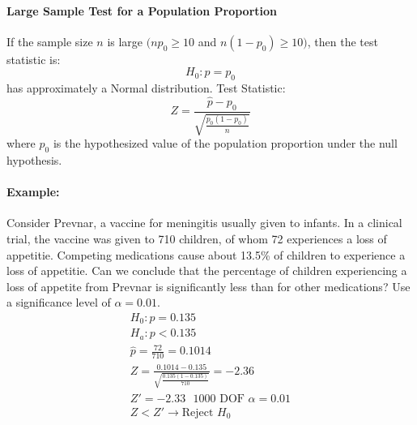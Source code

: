 \paragraph*{Large Sample Test for a Population Proportion}
If the sample size $n$ is large $(np_0 \geq 10$ and $n(1-p_0) \geq 10)$, then the test statistic is:
\[
    H_0 : p = p_0
\]
has approximately a Normal distribution. Test Statistic:
\[
    Z = \frac{\hat{p} - p_0}{\sqrt{\frac{p_0(1 - p_0)}{n}}}
\]
where $p_0$ is the hypothesized value of the population proportion under the null hypothesis.

\paragraph*{Example:}
Consider Prevnar, a vaccine for meningitis usually given to infants. In a clinical trial, the vaccine was given to 710 children,
of whom 72 experiences a loss of appetitie. Competing medications cause about 13.5\% of 
children to experience a loss of appetitie. Can we conclude that the percentage of children experiencing a loss of 
appetite from Prevnar is significantly less than for other medications? Use a significance level of $\alpha = 0.01$.
\begin{align*}
    H_0 : p = 0.135\\
    H_a : p < 0.135\\
    \hat{p} = \frac{72}{710} = 0.1014\\
    Z = \frac{0.1014 - 0.135}{\sqrt{\frac{0.135(1-0.135)}{710}}} = -2.36\\
    Z' = -2.33 \text{ ~1000 DOF } \alpha = 0.01\\
    Z < Z' \rightarrow \text{Reject } H_0
\end{align*}